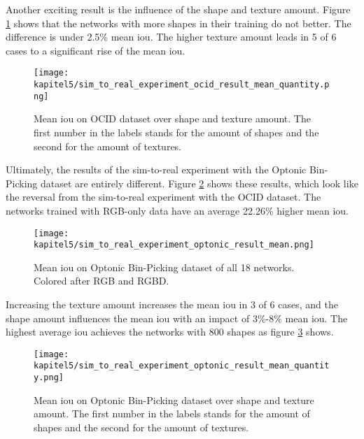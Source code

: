 			Another exciting result is the influence of the shape and texture amount. Figure \ref{img:str-ocid-qunatity} shows that the networks with more shapes in their training do not better. The difference is under 2.5\% mean \ac{iou}. The higher texture amount leads in 5 of 6 cases to a significant rise of the mean \ac{iou}.
			
			\FloatBarrier
			\begin{figure}[h]
				\centering
				\texttt{[image: kapitel5/sim\_to\_real\_experiment\_ocid\_result\_mean\_quantity.png]}
				\caption[Mean \ac{iou} on OCID dataset over shape and texture amount. The first number in the labels stands for the amount of shapes and the second for the amount of textures.]{Mean \ac{iou} on OCID dataset over shape and texture amount. The first number in the labels stands for the amount of shapes and the second for the amount of textures.}
				\label{img:str-ocid-qunatity}
			\end{figure}
			\FloatBarrier
			
			Ultimately, the results of the sim-to-real experiment with the Optonic Bin-Picking dataset are entirely different. Figure \ref{img:str-optonic} shows these results, which look like the reversal from the sim-to-real experiment with the OCID dataset. The networks trained with RGB-only data have an average 22.26\% higher mean \ac{iou}. 
			
			\FloatBarrier
			\begin{figure}[h]
				\centering
				\texttt{[image: kapitel5/sim\_to\_real\_experiment\_optonic\_result\_mean.png]}
				\caption[Mean \ac{iou} on Optonic Bin-Picking dataset of all 18 networks. Colored after RGB and RGBD.]{Mean \ac{iou} on Optonic Bin-Picking dataset of all 18 networks. Colored after RGB and RGBD.}
				\label{img:str-optonic}
			\end{figure}
			\FloatBarrier
			
			Increasing the texture amount increases the mean \ac{iou} in 3 of 6 cases, and the shape amount influences the mean \ac{iou} with an impact of 3\%-8\% mean \ac{iou}. The highest average \ac{iou} achieves the networks with 800 shapes as figure \ref{img:str-optonic-qunatity} shows.
			
			\FloatBarrier
			\begin{figure}[h]
				\centering
				\texttt{[image: kapitel5/sim\_to\_real\_experiment\_optonic\_result\_mean\_quantity.png]}
				\caption[Mean \ac{iou} on Optonic Bin-Picking dataset over shape and texture amount. The first number in the labels stands for the amount of shapes and the second for the amount of textures.]{Mean \ac{iou} on Optonic Bin-Picking dataset over shape and texture amount. The first number in the labels stands for the amount of shapes and the second for the amount of textures.}
				\label{img:str-optonic-qunatity}
			\end{figure}
			\FloatBarrier



